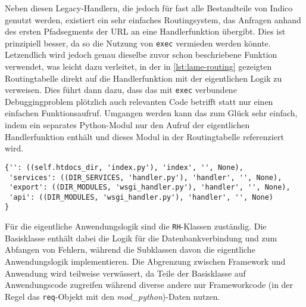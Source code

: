 Neben diesen Legacy-Handlern, die jedoch für fast alle Bestandteile von Indico genutzt werden,
existiert ein sehr einfaches Routingsystem, das Anfragen anhand des ersten Pfadsegments der URL an
eine Handlerfunktion übergibt. Dies ist prinzipiell besser, da so die Nutzung von \lstinline{exec}
vermieden werden könnte. Letzendlich wird jedoch genau dieselbe zuvor schon
beschriebene Funktion verwendet, was leicht dazu verleitet, in der in \autoref{lst:lame-routing}
gezeigten Routingtabelle direkt auf die Handlerfunktion mit der eigentlichen Logik zu verweisen.
Dies führt dann dazu, dass das mit \lstinline{exec} verbundene Debuggingproblem plötzlich
auch relevanten Code betrifft statt nur einen einfachen Funktionsaufruf. Umgangen werden kann das
zum Glück sehr einfach, indem ein separates Python-Modul nur den Aufruf der eigentlichen
Handlerfunktion enthält und dieses Modul in der Routingtabelle referenziert wird.

\begin{lstlisting}[caption=Einfaches URL-Routing,label=lst:lame-routing]
{'': ((self.htdocs_dir, 'index.py'), 'index', '', None),
 'services': ((DIR_SERVICES, 'handler.py'), 'handler', '', None),
 'export': ((DIR_MODULES, 'wsgi_handler.py'), 'handler', '', None),
 'api': ((DIR_MODULES, 'wsgi_handler.py'), 'handler', '', None)
}
\end{lstlisting}

Für die eigentliche Anwendungslogik sind die \lstinline{RH}-Klassen zuständig. Die Basisklasse
enthält dabei die Logik für die Datenbankverbindung und zum Abfangen von Fehlern, während die
Subklassen davon die eigentliche Anwendungslogik implementieren. Die Abgrenzung zwischen Framework
und Anwendung wird teilweise verwässert, da Teile der Basisklasse auf Anwendungscode zugreifen
während diverse andere nur Frameworkcode (in der Regel das \lstinline{req}-Objekt mit den
\emph{mod\_python})-Daten nutzen.

